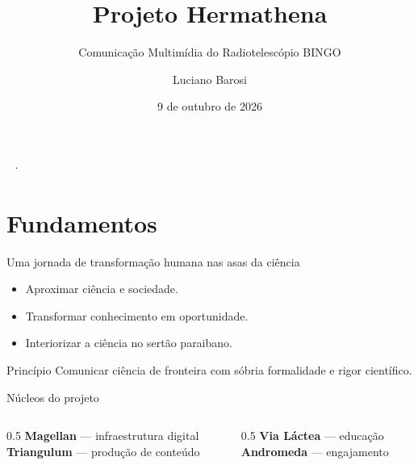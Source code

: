\documentclass[aspectratio=169,11pt]{beamer}
\title{Projeto Hermathena}
\subtitle{Comunicação Multimídia do Radiotelescópio BINGO}
\author{Luciano Barosi}
\date{9 de outubro de 2026}
\begin{document}
\begin{frame}[plain]
  \vfill
  \begin{center}
    \hermathenaLogo[3cm]\par\vspace{10pt}
    {\hermaDisplay\color{hermaGrafite}\Huge\bfseries \inserttitle}\par\vspace{4pt}
    {\hermaDisplay\color{hermaAzulBingo}\large \insertsubtitle}\par\vspace{14pt}
    \hermaRule[0.6\linewidth]\par\vspace{8pt}
    {\color{hermaGrafite}\insertauthor\ · \insertdate}
  \end{center}
  \vfill
\end{frame}

\section{Fundamentos}
\begin{frame}{Uma jornada de transformação humana nas asas da ciência}
  \begin{itemize}
    \item Aproximar ciência e sociedade.
    \item Transformar conhecimento em oportunidade.
    \item Interiorizar a ciência no sertão paraibano.
  \end{itemize}
  \vspace{8pt}
  \begin{block}{Princípio}
    Comunicar ciência de fronteira com sóbria formalidade e rigor científico.
  \end{block}
\end{frame}

\begin{frame}{Núcleos do projeto}
  \begin{columns}[T]
    \begin{column}{0.5\textwidth}
      \textbf{Magellan} — infraestrutura digital\\
      \textbf{Triangulum} — produção de conteúdo
    \end{column}
    \begin{column}{0.5\textwidth}
      \textbf{Via Láctea} — educação\\
      \textbf{Andromeda} — engajamento
    \end{column}
  \end{columns}
\end{frame}
\end{document}

